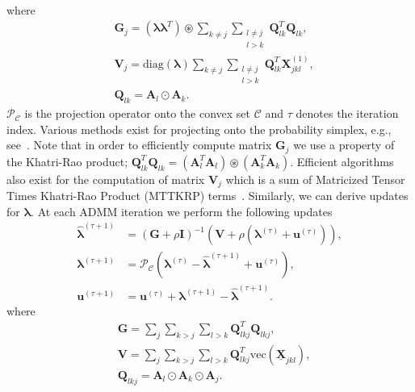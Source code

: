 \documentclass[journal]{IEEEtran}
\begin{document}
\begin{appendices}
\begin{equation*}
\begin{aligned}
\end{aligned}
\end{equation*}
where
\begin{equation*}
\begin{aligned}
& \mathbf{G}_j = (\boldsymbol{\lambda}\boldsymbol{\lambda}^T) \circledast  \sum_{k \neq j}  \sum_{\substack{l\neq j \\ l > k}}  \mathbf{Q}_{lk}^T\mathbf{Q}_{lk}, \\
& \mathbf{V}_j = \textrm{diag}(\boldsymbol{\lambda}) \sum_{k \neq j}  \sum_{\substack{l\neq j \\ l > k}} \mathbf{Q}_{lk}^T {\mathbf{X}}_{jkl}^{(1)}, \\
& \mathbf{Q}_{lk} = \mathbf{A}_l \odot \mathbf{A}_k.
\end{aligned}
\end{equation*}
$\mathcal{P}_{\mathcal{C}}$ is the projection operator onto the convex set  $\mathcal{C}$ and $\tau$ denotes the iteration index. Various methods exist for projecting onto the probability simplex, e.g., see~\cite{WaCa2013}. Note that in order to efficiently compute matrix $\mathbf{G}_j$ we use a property of the Khatri-Rao product; $\mathbf{Q}_{lk}^T\mathbf{Q}_{lk} = (\mathbf{A}_l^T\mathbf{A}_l )\circledast(\mathbf{A}_k^T\mathbf{A}_k)$. Efficient algorithms also exist for the computation of matrix $\mathbf{V}_j$ which is a sum of Matricized Tensor Times Khatri-Rao Product (MTTKRP) terms~\cite{BaKo2008,SmiRaSi2015}. 
Similarly, we can derive updates for $\boldsymbol{\lambda}$.  At each ADMM iteration we perform the following updates
\begin{equation*}
\begin{aligned}
\widehat{\boldsymbol{\lambda}}^{(\tau+1)} & =  (\mathbf{G} + \rho \mathbf{I})^{-1} \left( \mathbf{V}  + \rho \left ( \boldsymbol{\lambda}^{(\tau)} + \mathbf{u}^{(\tau)} \right) \right), \\
\boldsymbol{\lambda}^{(\tau + 1)} & =  \mathcal{P}_{\mathcal{C}} \left( \boldsymbol{\lambda}^{(\tau)} - \widehat{\boldsymbol{\lambda}}^{(\tau + 1)} + \mathbf{u}^{(\tau)} \right), \\
\mathbf{u}^{(\tau + 1)} & =  \mathbf{u}^{(\tau)} + \boldsymbol{\lambda}^{(\tau+1)} - \widehat{\boldsymbol{\lambda}}^{(\tau + 1)}.
\end{aligned}
\end{equation*}
where
\begin{equation*}
\begin{aligned}
& \mathbf{G} =  \sum_j \sum_{ k > j} \sum_{l>k}  \mathbf{Q}_{lkj}^T\mathbf{Q}_{lkj}, \\
& \mathbf{V} = \sum_j \sum_{ k > j} \sum_{l>k} \mathbf{Q}_{lkj}^T \text{vec}(\underline{\mathbf{X}}_{jkl}), \\
& \mathbf{Q}_{lkj} = \mathbf{A}_l \odot \mathbf{A}_k \odot \mathbf{A}_j.
\end{aligned}
\end{equation*}


\end{appendices}





\end{document}
